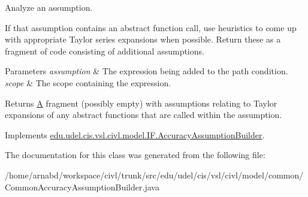 Analyze an assumption. 

If that assumption contains an abstract function call, use heuristics to come up with appropriate Taylor series expansions when possible. Return these as a fragment of code consisting of additional assumptions.


\begin{DoxyParams}{Parameters}
{\em assumption} & The expression being added to the path condition. \\
\hline
{\em scope} & The scope containing the expression. \\
\hline
\end{DoxyParams}
\begin{DoxyReturn}{Returns}
\hyperlink{structA}{A} fragment (possibly empty) with assumptions relating to Taylor expansions of any abstract functions that are called within the assumption. 
\end{DoxyReturn}


Implements \hyperlink{interfaceedu_1_1udel_1_1cis_1_1vsl_1_1civl_1_1model_1_1IF_1_1AccuracyAssumptionBuilder_a55574da8c81d81379e9ec4e7ddf90f32}{edu.\+udel.\+cis.\+vsl.\+civl.\+model.\+I\+F.\+Accuracy\+Assumption\+Builder}.



The documentation for this class was generated from the following file\+:\begin{DoxyCompactItemize}
\item 
/home/arnabd/workspace/civl/trunk/src/edu/udel/cis/vsl/civl/model/common/Common\+Accuracy\+Assumption\+Builder.\+java\end{DoxyCompactItemize}
